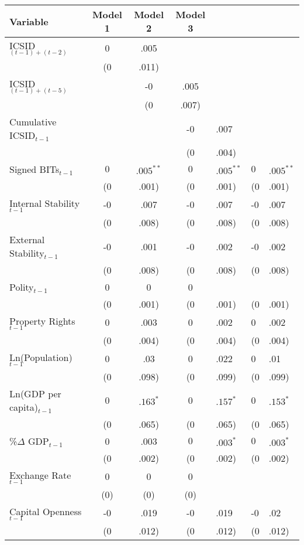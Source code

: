 \begin{table}[ht]
\centering
{\footnotesize
\begin{tabular}{lccc}
 Variable & Model 1 & Model 2 & Model 3 \\ 
  \hline
\hline
ICSID$_{(t-1) + (t-2)}$ & 0&.005 &  &  \\ 
   & (0&.011) &  &  \\ 
  ICSID$_{(t-1) + (t-5)}$ &  & -0&.005 &  \\ 
   &  & (0&.007) &  \\ 
  Cumulative ICSID$_{t-1}$ &  &  & -0&.007 \\ 
   &  &  & (0&.004) \\ 
  Signed BITs$_{t-1}$ & $0$&$.005^{\ast\ast}$ & $0$&$.005^{\ast\ast}$ & $0$&$.005^{\ast\ast}$ \\ 
   & (0&.001) & (0&.001) & (0&.001) \\ 
  Internal Stability$_{t-1}$ & -0&.007 & -0&.007 & -0&.007 \\ 
   & (0&.008) & (0&.008) & (0&.008) \\ 
  External Stability$_{t-1}$ & -0&.001 & -0&.002 & -0&.002 \\ 
   & (0&.008) & (0&.008) & (0&.008) \\ 
  Polity$_{t-1}$ & 0 & 0 & 0 \\ 
   & (0&.001) & (0&.001) & (0&.001) \\ 
  Property Rights$_{t-1}$ & 0&.003 & 0&.002 & 0&.002 \\ 
   & (0&.004) & (0&.004) & (0&.004) \\ 
  Ln(Population)$_{t-1}$ & 0&.03 & 0&.022 & 0&.01 \\ 
   & (0&.098) & (0&.099) & (0&.099) \\ 
  Ln(GDP per capita)$_{t-1}$ & $0$&$.163^{\ast}$ & $0$&$.157^{\ast}$ & $0$&$.153^{\ast}$ \\ 
   & (0&.065) & (0&.065) & (0&.065) \\ 
  \%$\Delta$ GDP$_{t-1}$ & 0&.003 & $0$&$.003^{\ast}$ & $0$&$.003^{\ast}$ \\ 
   & (0&.002) & (0&.002) & (0&.002) \\ 
  Exchange Rate$_{t-1}$ & 0 & 0 & 0 \\ 
   & (0) & (0) & (0) \\ 
  Capital Openness$_{t-1}$ & -0&.019 & -0&.019 & -0&.02 \\ 
   & (0&.012) & (0&.012) & (0&.012) \\ 

\end{tabular}}
\end{table}
